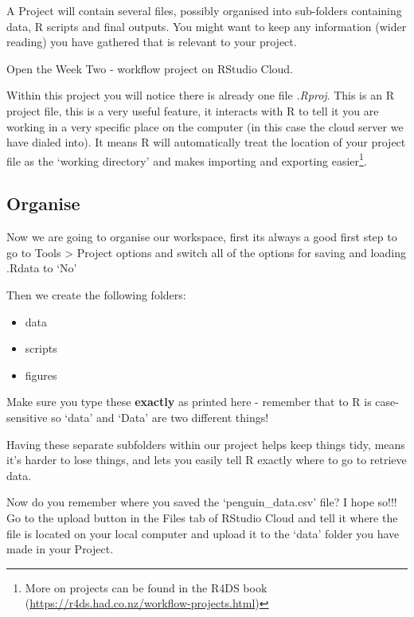 \documentclass[
]{book}
\makeatletter
\newenvironment{kframe}{%
\medskip{}
\setlength{\fboxsep}{.8em}
 \def\at@end@of@kframe{}%
 \ifinner\ifhmode%
  \def\at@end@of@kframe{\end{minipage}}%
  \begin{minipage}{\columnwidth}%
 \fi\fi%
 \def\FrameCommand##1{\hskip\@totalleftmargin \hskip-\fboxsep
 \colorbox{shadecolor}{##1}\hskip-\fboxsep
     \hskip-\linewidth \hskip-\@totalleftmargin \hskip\columnwidth}%
 \MakeFramed {\advance\hsize-\width
   \@totalleftmargin\z@ \linewidth\hsize
   \@setminipage}}%
 {\par\unskip\endMakeFramed%
 \at@end@of@kframe}
\newenvironment{block}[1]
  {
  \begin{itemize}
  \renewcommand{\labelitemi}{
    \raisebox{-.7\height}[0pt][0pt]{
      {\setkeys{Gin}{width=3em,keepaspectratio}\texttt{[image: images/\#1]}}
    }
  }
  \setlength{\fboxsep}{1em}
  \begin{kframe}
  \item
  }
  {
  \end{kframe}
  \end{itemize}
  }
\newenvironment{rmdwarning}
  {\begin{block}{warning}}
  {\end{block}}
\makeatother
\begin{document}
A Project will contain several files, possibly organised into sub-folders containing data, R scripts and final outputs. You might want to keep any information (wider reading) you have gathered that is relevant to your project.

Open the Week Two - workflow project on RStudio Cloud.

Within this project you will notice there is already one file \emph{.Rproj}. This is an R project file, this is a very useful feature, it interacts with R to tell it you are working in a very specific place on the computer (in this case the cloud server we have dialed into). It means R will automatically treat the location of your project file as the `working directory' and makes importing and exporting easier\footnote{More on projects can be found in the R4DS book (\url{https://r4ds.had.co.nz/workflow-projects.html})}.

\hypertarget{organise}{%
\subsection{Organise}\label{organise}}

Now we are going to organise our workspace, first its always a good first step to go to Tools \textgreater{} Project options and switch all of the options for saving and loading .Rdata to `No'

Then we create the following folders:

\begin{itemize}
\item
  data
\item
  scripts
\item
  figures
\end{itemize}

\begin{rmdwarning}
Make sure you type these \textbf{exactly} as printed here - remember
that to R is case-sensitive so `data' and `Data' are two different
things!
\end{rmdwarning}

Having these separate subfolders within our project helps keep things tidy, means it's harder to lose things, and lets you easily tell R exactly where to go to retrieve data.

Now do you remember where you saved the `penguin\_data.csv' file? I hope so!!! Go to the upload button in the Files tab of RStudio Cloud and tell it where the file is located on your local computer and upload it to the `data' folder you have made in your Project.
\end{document}

